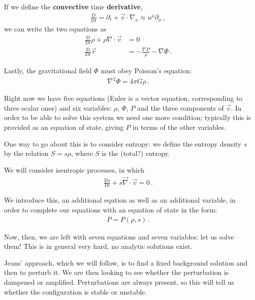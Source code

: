 \documentclass[main.tex]{subfiles}
\begin{document}
If we define the \textbf{convective} time \textbf{derivative},  
%
\begin{align}
  \frac{ \mathrm{D} }{\mathrm{D}t} = \partial_{t} + \vec{v} \cdot \nabla_{x} \approx u^{\mu } \partial_{\mu }
\,,
\end{align}
%
we can write the two equations as 
%
\begin{align}
  \frac{ \mathrm{D} }{\mathrm{D}t} \rho + \rho \nabla \cdot \vec{v} &= 0 \\
  \frac{ \mathrm{D} }{\mathrm{D}t} \vec{v} 
  &= - \frac{\nabla P}{\rho } - \nabla \Phi 
\,.
\end{align}

Lastly, the gravitational field \(\Phi \) must obey Poisson's equation:
%
\begin{align}
  \nabla^2 \Phi = 4 \pi G \rho 
\,.
\end{align}

Right now we have five equations (Euler is a vector equation, corresponding to three scalar ones) and six variables: \(\rho \), \(\Phi \), \(P\) and the three components of \(\vec{v}\). 
In order to be able to solve this system we need one more condition; typically this is provided as an equation of state, giving \(P\) in terms of the other variables. 

One way to go about this is to consider entropy: we define the entropy density \(s \) by the relation \(S  = s \rho \), where \(S\) is the (total?) entropy. 

We will consider isentropic processes, in which 
%
\begin{align}
  \frac{ \mathrm{D} s}{\mathrm{D}t} + s \vec{\nabla} \cdot \vec{v} = 0
\,.
\end{align}

We introduce this, an additional eqution as well as an additional variable, in order to complete our equations with an equation of state in the form: 
%
\begin{align}
P = P(\rho , s)
\,.
\end{align}

Now, then, we are left with seven equations and seven variables: let us solve them!
This is in general very hard, no analytic solutions exist.

Jeans' approach, which we will follow, is to find a fixed background solution and then to perturb it. 
We are then looking to see whether the perturbation is dampened or amplified. Perturbations are always present, so this will tell us whether the configuration is stable or unstable.
\end{document}
